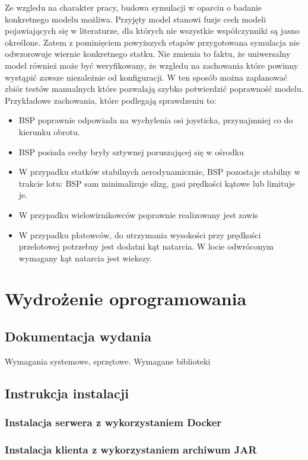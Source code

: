 \documentclass[15pt]{sprawozdanie}
\begin{document}
Ze wzgledu na charakter pracy, budowa symulacji w oparciu o badanie konkretnego modelu możliwa. Przyjęty model stanowi fuzje cech modeli pojawiających się w literaturze, dla których nie wszystkie współczynniki są jasno określone. Zatem z pominięciem powyższych etapów przygotowana symulacja nie odwzorowuje wiernie konkretnego statku. Nie zmienia to faktu, że uniwersalny model również może być weryfikowany, że wzgledu na zachowania które powinny wystąpić zawsze niezależnie od konfiguracji. W ten sposób można zaplanować zbiór testów manualnych które pozwalają szybko potwierdzić poprawność modelu. Przykładowe zachowania, które podlegają sprawdzeniu to:
\begin{itemize}[noitemsep]
\item BSP poprawnie odpowiada na wychylenia osi joysticka, przynajmniej co do kierunku obrotu.
\item BSP posiada cechy bryły sztywnej poruszającej się w ośrodku
\item W przypadku statków stabilnych aerodynamicznie, BSP pozostaje stabilny w trakcie lotu: BSP sam minimalizuje slizg, gasi prędkości kątowe lub limituje je.
\item W przypadku wielowirnikowców poprawnie realizowany jest zawis
\item W przypadku płatowców, do utrzymania wysokości przy prędkości przelotowej potrzebny jest dodatni kąt natarcia. W locie odwróconym wymagany kąt natarcia jest wiekszy.
\end{itemize}


\color{blue}
\newpage
\section{Wydrożenie oprogramowania}
\subsection{Dokumentacja wydania}
Wymagania systemowe, sprzętowe. Wymagane biblioteki

\subsection{Instrukcja instalacji}
\subsubsection{Instalacja serwera z wykorzystaniem Docker}
\subsubsection{Instalacja klienta z wykorzystaniem archiwum JAR}
\end{document}
